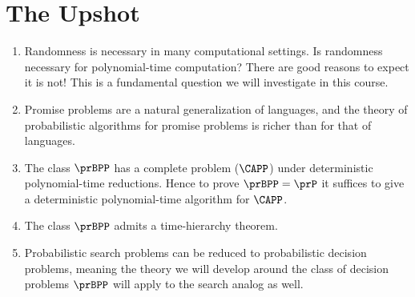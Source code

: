 \section*{The Upshot}

\begin{enumerate}
  \item Randomness is necessary in many computational settings. Is randomness
    necessary for polynomial-time computation? There are good reasons to expect
    it is not! This is a fundamental question we will investigate in this
    course.
  \item Promise problems are a natural generalization of languages, and the
    theory of probabilistic algorithms for promise problems is richer than
    for that of languages.
  \item The class $\prBPP$ has a complete problem ($\CAPP$) under deterministic
    polynomial-time reductions. Hence to prove $\prBPP = \prP$ it suffices
    to give a deterministic polynomial-time algorithm for $\CAPP$.
  \item The class $\prBPP$ admits a time-hierarchy theorem.
  \item Probabilistic search problems can be reduced to probabilistic decision
    problems, meaning the theory we will develop around the class of decision
    problems $\prBPP$ will apply to the search analog as well.
\end{enumerate}
